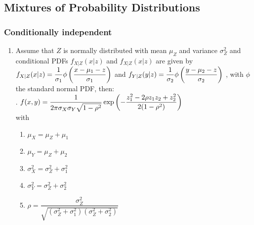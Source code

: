 \subsection{Mixtures of Probability Distributions}

\subsubsection{Conditionally independent}

\begin{enumerate}
    \item Assume that $Z$ is normally distributed with mean $\mu_Z$ and variance $\sigma^2_Z$ and conditional PDFs $f_{X|Z} (x|z)$ and $f_{X|Z} (x|z)$ are given by $f_{X|Z} (x|z) = \dfrac{1}{\sigma_1} \phi\left(\dfrac{x - \mu_1 - z}{\sigma_1}\right)$ and $f_{Y |Z} (y|z) = \dfrac{1}{\sigma_2} \phi\left(\dfrac{y - \mu_2 - z}{\sigma_2}\right)$ , with $\phi$ the standard normal PDF, then:
    \hfill \cite{statistics/book/Statistics-for-Data-Scientists/Maurits-Kaptein}
    \\
    .\hfill
    $
        f (x, y)
        = \dfrac{1}{ 2\pi\sigma_X \sigma_Y \sqrt{1 - \rho^2} }
        \exp \left(
            - \dfrac{z^2_1 - 2\rho z_1z_2 + z^2_2 }{2(1 - \rho^2)}
        \right)
    $
    \hfill \cite{statistics/book/Statistics-for-Data-Scientists/Maurits-Kaptein}
    \\
    with
    \begin{multicols}{2}
    \begin{enumerate}
        \item $\mu_X = \mu_Z + \mu_1$
        \hfill \cite{statistics/book/Statistics-for-Data-Scientists/Maurits-Kaptein}

        \item $\mu_Y = \mu_Z + \mu_2$
        \hfill \cite{statistics/book/Statistics-for-Data-Scientists/Maurits-Kaptein}

        \item $\sigma^2_X = \sigma^2_Z + \sigma^2_1$
        \hfill \cite{statistics/book/Statistics-for-Data-Scientists/Maurits-Kaptein}

        \item $\sigma^2_Y = \sigma^2_Z + \sigma^2_2$
        \hfill \cite{statistics/book/Statistics-for-Data-Scientists/Maurits-Kaptein}

        \item $\rho = \dfrac{\sigma^2_Z }{\sqrt{(\sigma^2_Z + \sigma^2_1 )(\sigma^2_Z + \sigma^2_2 )}}$
        \hfill \cite{statistics/book/Statistics-for-Data-Scientists/Maurits-Kaptein}
    \end{enumerate}
    \end{multicols}
\end{enumerate}





